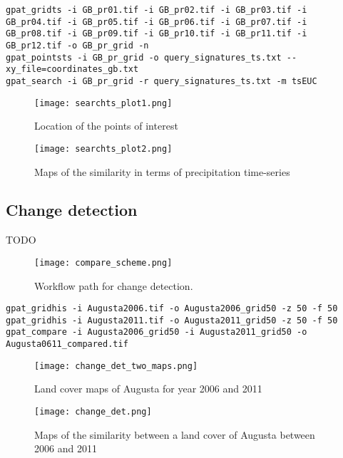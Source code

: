 \begin{minipage}{\linewidth}
\begin{lstlisting}
gpat_gridts -i GB_pr01.tif -i GB_pr02.tif -i GB_pr03.tif -i GB_pr04.tif -i GB_pr05.tif -i GB_pr06.tif -i GB_pr07.tif -i GB_pr08.tif -i GB_pr09.tif -i GB_pr10.tif -i GB_pr11.tif -i GB_pr12.tif -o GB_pr_grid -n
gpat_pointsts -i GB_pr_grid -o query_signatures_ts.txt --xy_file=coordinates_gb.txt
gpat_search -i GB_pr_grid -r query_signatures_ts.txt -m tsEUC
\end{lstlisting}
\end{minipage}

\begin{figure}[H]
	\centering
	\texttt{[image: searchts\_plot1.png]}
	\caption{Location of the points of interest}
	\label{FIG:SEARCHTS1}
\end{figure}

\begin{figure}[H]
	\centering
	\texttt{[image: searchts\_plot2.png]}
	\caption{Maps of the similarity in terms of precipitation time-series}
	\label{FIG:SEARCHTS2}
\end{figure}

\FloatBarrier

\subsection{Change detection}
TODO
\begin{figure}[H]
	\centering
	\texttt{[image: compare\_scheme.png]}
	\caption{Workflow path for change detection.}
	\label{FIG:CHANGE}
\end{figure}

\begin{minipage}{\linewidth}
\begin{lstlisting}
gpat_gridhis -i Augusta2006.tif -o Augusta2006_grid50 -z 50 -f 50
gpat_gridhis -i Augusta2011.tif -o Augusta2011_grid50 -z 50 -f 50
gpat_compare -i Augusta2006_grid50 -i Augusta2011_grid50 -o Augusta0611_compared.tif
\end{lstlisting}
\end{minipage}

\begin{figure}[H]
	\centering
	\texttt{[image: change\_det\_two\_maps.png]}
	\caption{Land cover maps of Augusta for year 2006 and 2011}
	\label{FIG:CHANGEDET1}
\end{figure}

\begin{figure}[H]
	\centering
	\texttt{[image: change\_det.png]}
	\caption{Maps of the similarity between a land cover of Augusta between 2006 and 2011}
	\label{FIG:CHANGEDET2}
\end{figure}


